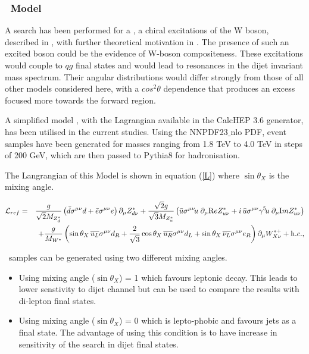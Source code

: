  \clearpage
\subsubsection{\Wstar\ Model}
\label{sec:Wstar}

 A search has been performed for a \Wstar, a chiral excitations of the W boson, described in \cite{Chizhov:2010jg}, with further theoretical motivation in \cite{Chizhov:2009fc}. The presence of such an excited boson could be the evidence of W-boson compositeness. These excitations would couple to $qg$ final states and would lead to resonances in the dijet invariant mass spectrum. Their angular distributions would differ strongly from those of all other models considered here, with a $cos^{2}\theta$ dependence that produces an excess focused more towards the forward region. 

 A simplified model \cite{Chizhov:2010ry}, with the Lagrangian available in the CalcHEP 3.6 generator, has been utilised in the current studies. Using the NNPDF23$\_$nlo PDF, \Wstar event samples have been generated for masses ranging from 1.8 TeV to 4.0 TeV in steps of 200 GeV, which are then passed to Pythia8 for hadronisation. 

The Langrangian of this Model is shown in equation (\ref{L}) where $\sin \theta_{X}$ is the mixing angle.

\begin{eqnarray}\label{L}
{\cal L}_{ref}&=&\frac{g}{\sqrt{2}M_{Z^*_d}}\left(
\bar{d}\sigma^{\mu\nu}d+\bar{e}\sigma^{\mu\nu}e
\right)\partial_\mu Z^*_{d\nu}+
\frac{\sqrt{2}g}{\sqrt{3}M_{Z^*_u}}\left(\bar{u}\sigma^{\mu\nu}\!u\;
\partial_\mu {\mathrm Re}Z^*_{u\nu}+
i\,\bar{u}\sigma^{\mu\nu}\gamma^5\!u\;
\partial_\mu {\mathrm Im}Z^*_{u\nu}\right) \nonumber\\
&&\hspace{-0.8cm}+\frac{g}{M_{W^*}}\left(\sin\theta_X\,\overline{u_L}\sigma^{\mu\nu}d_R+
\frac{2}{\sqrt{3}}\cos\theta_X\,\overline{u_R}\sigma^{\mu\nu}d_L+
\sin\theta_X\,\overline{\nu_L}\sigma^{\mu\nu}e_R
\right)\partial_\mu W^{*+}_{X\nu} + {\mathrm h.c.},
\end{eqnarray}

\Wstar\ samples can be generated using two different mixing angles.
\begin{itemize}
\label{sec:WstarSamples}
\item Using mixing angle ($\sin \theta_X$) = 1 which favours leptonic decay. This leads to lower senstivity to dijet channel but can be used to compare the results with di-lepton final states.
\item Using mixing angle ($\sin \theta_X$) = 0 which is lepto-phobic and favours jets as a final state. The advantage of using this condition is to have increase in sensitivity of the search  in dijet final states. 
\end{itemize}

